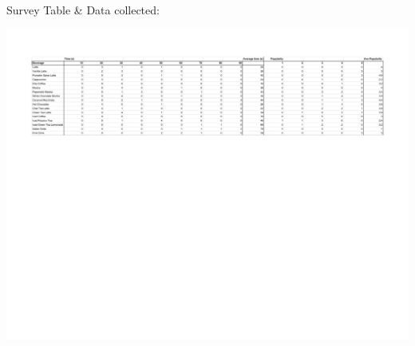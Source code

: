 \documentclass[a4paper]{article}
\begin{document}
\noindent Survey Table \& Data collected:

\begin{center}
	\includegraphics[scale=0.6]{Survey_Summary}
\end{center}

\newpage


\end{document}
